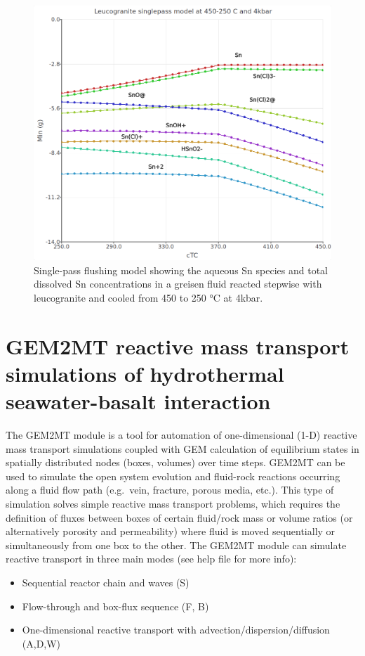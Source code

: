 \documentclass[
]{book}
\providecommand{\tightlist}{%
  \setlength{\itemsep}{0pt}\setlength{\parskip}{0pt}}
\begin{document}
\begin{figure}
\includegraphics[width=0.9\linewidth]{figures/module4/fig-21} \caption{Single-pass flushing model showing the aqueous Sn species and total dissolved Sn concentrations in a greisen fluid reacted stepwise with leucogranite and cooled from  450 to 250 °C at 4kbar.}\label{fig:fig-21d}
\end{figure}

\hypertarget{module5}{%
\chapter{GEM2MT reactive mass transport simulations of hydrothermal seawater-basalt interaction}\label{module5}}

The GEM2MT module is a tool for automation of one-dimensional (1-D) reactive mass transport simulations coupled with GEM calculation of equilibrium states in spatially distributed nodes (boxes, volumes) over time steps. GEM2MT can be used to simulate the open system evolution and fluid-rock reactions occurring along a fluid flow path (e.g.~vein, fracture, porous media, etc.). This type of simulation solves simple reactive mass transport problems, which requires the definition of fluxes between boxes of certain fluid/rock mass or volume ratios (or alternatively porosity and permeability) where fluid is moved sequentially or simultaneously from one box to the other. The GEM2MT module can simulate reactive transport in three main modes (see help file for more info):

\begin{itemize}
\tightlist
\item
  Sequential reactor chain and waves (S)
\item
  Flow-through and box-flux sequence (F, B)
\item
  One-dimensional reactive transport with advection/dispersion/diffusion (A,D,W)
\end{itemize}
\end{document}
